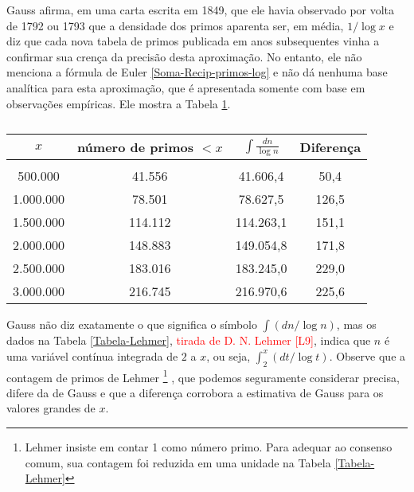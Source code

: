     Gauss afirma, em uma carta escrita em 1849, que ele havia observado por volta de 1792 ou 1793 que a densidade dos primos aparenta ser, em média, $1/\log x$ e diz que cada nova tabela de primos publicada em anos subsequentes vinha a confirmar sua crença da precisão desta aproximação. No entanto, ele não menciona a fórmula de Euler \eqref{Soma-Recip-primos-log} e não dá nenhuma base analítica para esta aproximação, que é apresentada somente com base em observações empíricas. Ele mostra a Tabela \ref{Tabela-Gauss}.
    \begin{table}[H]
        \centering
        \begin{tabular}{cccc}
             $x$& número de primos $< x$ & $\displaystyle \int \frac{dn}{\log n}$ &  Diferença
             \\[0.45cm]
             \hline
             \\[-0.3cm]
             500.000   & 41.556  & 41.606,4  & 50,4 \\[0.1cm]
             1.000.000 & 78.501  & 78.627,5  & 126,5 \\[0.1cm]
             1.500.000 & 114.112 & 114.263,1 & 151,1 \\[0.1cm]
             2.000.000 & 148.883 & 149.054,8 & 171,8 \\[0.1cm]
             2.500.000 & 183.016 & 183.245,0 & 229,0 \\[0.1cm]
             3.000.000 & 216.745 & 216.970,6 & 225,6
        \end{tabular}
        \caption{}
        \label{Tabela-Gauss}
    \end{table}
    
    Gauss não diz exatamente o que significa o símbolo $\int (dn/\log n)$, mas os dados na Tabela \ref{Tabela-Lehmer}, \textcolor{red}{tirada de D. N. Lehmer [L9]}, indica que $n$ é uma variável contínua integrada de $2$ a $x$, ou seja, $\int_{2}^{x}(dt/\log t)$. Observe que a contagem de primos de Lehmer
    \footnote{Lehmer insiste em contar 1 como número primo. Para adequar ao consenso comum, sua contagem foi reduzida em uma unidade na Tabela \ref{Tabela-Lehmer}}
    , que podemos seguramente considerar precisa, difere da de Gauss e que a diferença corrobora a estimativa de Gauss para os valores grandes de $x$.
    

